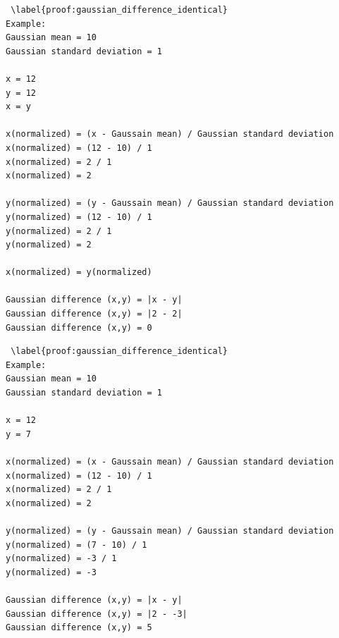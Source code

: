 \begin{lstlisting} \label{proof:gaussian_difference_identical}
Example:
Gaussian mean = 10
Gaussian standard deviation = 1

x = 12
y = 12
x = y

x(normalized) = (x - Gaussain mean) / Gaussian standard deviation
x(normalized) = (12 - 10) / 1
x(normalized) = 2 / 1
x(normalized) = 2

y(normalized) = (y - Gaussain mean) / Gaussian standard deviation
y(normalized) = (12 - 10) / 1
y(normalized) = 2 / 1
y(normalized) = 2

x(normalized) = y(normalized)

Gaussian difference (x,y) = |x - y|
Gaussian difference (x,y) = |2 - 2|
Gaussian difference (x,y) = 0
\end{lstlisting}


\begin{lstlisting} \label{proof:gaussian_difference_identical}
Example:
Gaussian mean = 10
Gaussian standard deviation = 1

x = 12
y = 7

x(normalized) = (x - Gaussain mean) / Gaussian standard deviation
x(normalized) = (12 - 10) / 1
x(normalized) = 2 / 1
x(normalized) = 2

y(normalized) = (y - Gaussain mean) / Gaussian standard deviation
y(normalized) = (7 - 10) / 1
y(normalized) = -3 / 1
y(normalized) = -3

Gaussian difference (x,y) = |x - y|
Gaussian difference (x,y) = |2 - -3|
Gaussian difference (x,y) = 5
\end{lstlisting}






